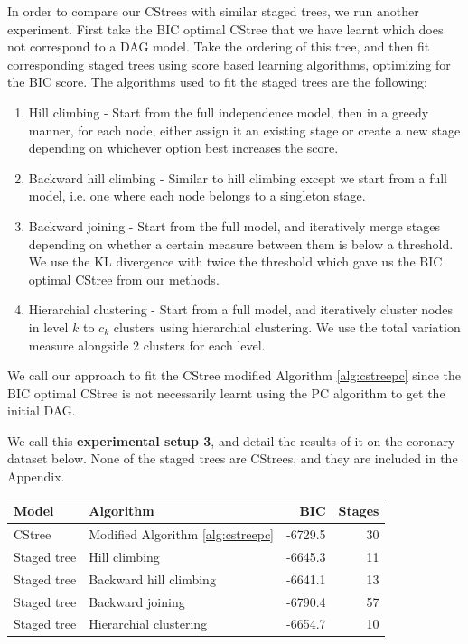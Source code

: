 \documentclass{tufte-book}
\begin{document}
In order to compare our CStrees with similar staged trees, we run another experiment. First take the BIC optimal CStree that we have learnt which does not correspond to a DAG model. Take the ordering of this tree, and then fit corresponding staged trees using score based learning algorithms, optimizing for the BIC score. The algorithms used to fit the staged trees are the following:
\begin{enumerate}
\item Hill climbing - Start from the full independence model, then in a greedy manner, for each node, either assign it an existing stage or create a new stage depending on whichever option best increases the score.
\item Backward hill climbing - Similar to hill climbing except we start from a full model, i.e. one where each node belongs to a singleton stage.
\item Backward joining - Start from the full model, and iteratively merge stages depending on whether a certain measure between them is below a threshold. We use the KL divergence with twice the threshold which gave us the BIC optimal CStree from our methods.
\item Hierarchial clustering - Start from a full model, and iteratively cluster nodes in level \(k\) to \(c_k\) clusters using hierarchial clustering. We use the total variation measure alongside 2 clusters for each level.
\end{enumerate}



We call our approach to fit the CStree modified Algorithm \ref{alg:cstreepc} since the BIC optimal CStree is not necessarily learnt using the PC algorithm to get the initial DAG.

We call this \textbf{experimental setup 3}, and detail the results of it on the coronary dataset below. None of the staged trees are CStrees, and they are included in the Appendix.


\begin{center}
\begin{tabular}{l|l|r|r}
\hline
Model & Algorithm & BIC & Stages\\
\hline
CStree & Modified Algorithm \ref{alg:cstreepc} & -6729.5 & 30\\
Staged tree & Hill climbing & -6645.3 & 11\\
Staged tree & Backward hill climbing & -6641.1 & 13\\
Staged tree & Backward joining & -6790.4 & 57\\
Staged tree & Hierarchial clustering & -6654.7 & 10\\
\end{tabular}
\end{center}
\end{document}

